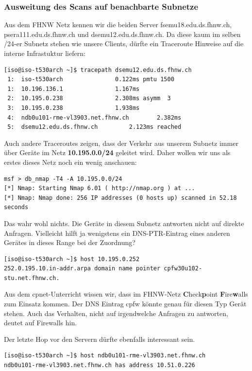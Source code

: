 \documentclass[11pt,a4paper]{scrartcl}
\begin{document}
\subsubsection{Ausweitung des Scans auf benachbarte Subnetze}
Aus dem FHNW Netz kennen wir die beiden Server fsemu18.edu.ds.fhnw.ch, psera111.edu.ds.fhnw.ch und dsemu12.edu.ds.fhnw.ch. Da diese kaum im selben /24-er Subnetz stehen wie unsere Clients, dürfte ein Traceroute Hinweise auf die interne Infrastuktur liefern:
\begin{lstlisting}
[iso@iso-t530arch ~]$ tracepath dsemu12.edu.ds.fhnw.ch
 1:  iso-t530arch				0.122ms pmtu 1500
 1:  10.196.136.1				1.167ms
 2:  10.195.0.238				2.308ms asymm  3 
 3:  10.195.0.238 				1.938ms 
 4:  ndb0u101-rme-vl3903.net.fhnw.ch		2.382ms 
 5:  dsemu12.edu.ds.fhnw.ch			2.123ms reached
\end{lstlisting}
Auch andere Traceroutes zeigen, dass der Verkehr aus unserem Subnetz immer über Geräte im Netz \textbf{10.195.0.0/24} geleitet wird. Daher wollen wir uns als erstes dieses Netz noch ein wenig anschauen:
\begin{lstlisting}
msf > db_nmap -T4 -A 10.195.0.0/24
[*] Nmap: Starting Nmap 6.01 ( http://nmap.org ) at ...
[*] Nmap: Nmap done: 256 IP addresses (0 hosts up) scanned in 52.18 seconds
\end{lstlisting}
Das wahr wohl nichts. Die Geräte in diesem Subnetz antworten nicht auf direkte Anfragen. Vielleicht hilft ja wenigstens ein DNS-PTR-Eintrag eines anderen Gerätes in dieses Range bei der Zuordnung?
\begin{lstlisting}
[iso@iso-t530arch ~]$ host 10.195.0.252
252.0.195.10.in-addr.arpa domain name pointer cpfw30u102-stu.net.fhnw.ch.
\end{lstlisting}
Aus dem cpnet-Unterricht wissen wir, dass im FHNW-Netz \textbf{C}heck\textbf{p}oint \textbf{F}ire\textbf{w}alls zum Einsatz kommen. Der DNS Eintrag cpfw könnte genau für diesen Typ Gerät stehen. Auch das Verhalten, nicht auf irgendwelche Anfragen zu antworten, deutet auf Firewalls hin.

Der letzte Hop vor den Servern dürfte ebenfalls interessant sein.
\begin{lstlisting}
[iso@iso-t530arch ~]$ host ndb0u101-rme-vl3903.net.fhnw.ch
ndb0u101-rme-vl3903.net.fhnw.ch has address 10.51.0.226
\end{lstlisting}
\end{document}

